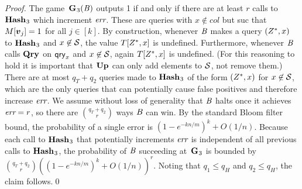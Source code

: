 \begin{proof}
The game~$\mathbf{G}\hspace{0.5pt}_3(\mathit{B})$ outputs 1 if and only if there are at least $r$ calls to $\mathbf{Hash}\hspace{0.5pt}_3$ which increment $\textit{err}$. These are queries with $x \not\in col$ but suc that $M[\vv_j] = 1$ for all $j \in [k]$. By construction, whenever $\mathit{B}$ makes a query $(Z^*,x)$ to $\mathbf{Hash}\hspace{0.5pt}_3$ and $x \not\in \mathcal{S}$, the value $T[Z^*,x]$ is undefined. Furthermore, whenever $\mathit{B}$ calls $\mathbf{Qry}\hspace{0.5pt}$ on $\mathsf{qry}_x$ and $x \not\in \mathcal{S}$, again $T[Z^*,x]$ is undefined. (For this reasoning to hold it is important that $\mathbf{Up}\hspace{0.5pt}$ can only add elements to $\mathcal{S}$, not remove them.) There are at most $q_T + q_2$ queries made to $\mathbf{Hash}\hspace{0.5pt}_3$ of the form $(Z^*,x)$ for $x \not\in \mathcal{S}$, which are the only queries that can potentially cause false positives and therefore increase $\textit{err}$. We assume without loss of generality that $\mathit{B}$ halts once it achieves $\textit{err} = r$, so there are $\binom{q_T+q_2}{r}$ ways $\mathit{B}$ can win. By the standard Bloom filter bound, the probability of a single error is $(1-e^{-kn/m})^k + O(1/n)$. Because each call to $\mathbf{Hash}\hspace{0.5pt}_3$ that potentially increments $\textit{err}$ is independent of all previous calls to $\mathbf{Hash}\hspace{0.5pt}_3$, the probability of $\mathit{B}$ succeeding at~$\mathbf{G}\hspace{0.5pt}_3$ is bounded by $\binom{q_T+q_2}{r}\left((1-e^{-kn/m})^k + O(1/n)\right)^r$. Noting that $q_1 \le q_H$ and $q_2 \le q_H$, the claim follows.\hfill\qed
\end{proof}

